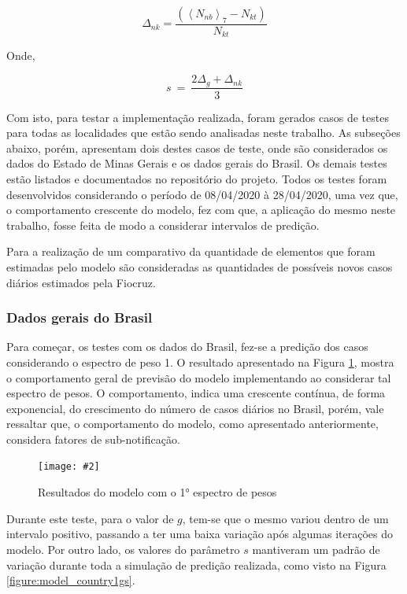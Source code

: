 \documentclass[a4paper,12pt]{article}
\newcommand{\image}[4]{
    \begin{figure}[H]%
        \begin{center}
        \caption{#3}
        \texttt{[image: \#2]}
        \label{#4}
        \end{center}
    \end{figure}
}
\begin{document}
\begin{equation}
\Delta _{nk}=\frac{\left(\left\langle N_{nb}\right\rangle _7-N_{kt}\right)}{N_{kt}}
\label{eq10}
\end{equation}

\par Onde,

\begin{equation}
s\:=\:\frac{2\Delta _g+\Delta _{nk}}{3}
\label{eq10}
\end{equation}

\par Com isto, para testar a implementação realizada, foram gerados casos de testes para todas as localidades que estão sendo analisadas neste trabalho. As subseções abaixo, porém, apresentam dois destes casos de teste, onde são considerados os dados do Estado de Minas Gerais e os dados gerais do Brasil. Os demais testes estão listados e documentados no repositório do projeto. Todos os testes foram desenvolvidos considerando o período de 08/04/2020 à 28/04/2020, uma vez que, o comportamento crescente do modelo, fez com que, a aplicação do mesmo neste trabalho, fosse feita de modo a considerar intervalos de predição.

\par Para a realização de um comparativo da quantidade de elementos que foram estimadas pelo modelo são consideradas as quantidades de possíveis novos casos diários estimados pela Fiocruz.

\subsubsection{Dados gerais do Brasil}
\label{sssectionBrasil}

\par Para começar, os testes com os dados do Brasil, fez-se a predição dos casos considerando o espectro de peso 1. O resultado apresentado na Figura \ref{figure:model_country1}, mostra o comportamento geral de previsão do modelo implementando ao considerar tal espectro de pesos. O comportamento, indica uma crescente contínua, de forma exponencial, do crescimento do número de casos diários no Brasil, porém, vale ressaltar que, o comportamento do modelo, como apresentado anteriormente, considera fatores de sub-notificação.

\image{0.85}{images/modelo/pais/estimativa_Brasil_1.png}{Resultados do modelo com o 1° espectro de pesos}{figure:model_country1}

\par Durante este teste, para o valor de $g$, tem-se que o mesmo variou dentro de um intervalo positivo, passando a ter uma baixa variação após algumas iterações do modelo. Por outro lado, os valores do parâmetro $s$ mantiveram um padrão de variação durante toda a simulação de predição realizada, como visto na Figura \ref{figure:model_country1gs}.
\end{document}

